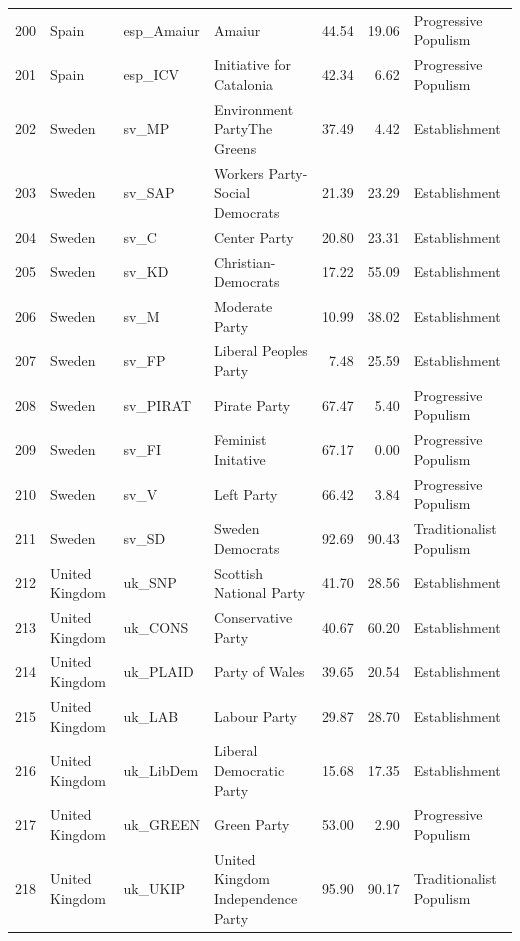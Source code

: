 \begin{landscape}
\begin{longtable}[c]{@{\extracolsep{\fill}}rlllrrl}
  200 & Spain & esp\_Amaiur & Amaiur & 44.54 & 19.06 & Progressive Populism \\ 
  201 & Spain & esp\_ICV & Initiative for Catalonia & 42.34 & 6.62 & Progressive Populism \\ 
  202 & Sweden & sv\_MP & Environment PartyThe Greens & 37.49 & 4.42 & Establishment \\ 
  203 & Sweden & sv\_SAP & Workers Party-Social Democrats & 21.39 & 23.29 & Establishment \\ 
  204 & Sweden & sv\_C & Center Party & 20.80 & 23.31 & Establishment \\ 
  205 & Sweden & sv\_KD & Christian-Democrats & 17.22 & 55.09 & Establishment \\ 
  206 & Sweden & sv\_M & Moderate Party & 10.99 & 38.02 & Establishment \\ 
  207 & Sweden & sv\_FP & Liberal Peoples Party & 7.48 & 25.59 & Establishment \\ 
  208 & Sweden & sv\_PIRAT & Pirate Party & 67.47 & 5.40 & Progressive Populism \\ 
  209 & Sweden & sv\_FI & Feminist Initative & 67.17 & 0.00 & Progressive Populism \\ 
  210 & Sweden & sv\_V & Left Party & 66.42 & 3.84 & Progressive Populism \\ 
  211 & Sweden & sv\_SD & Sweden Democrats & 92.69 & 90.43 & Traditionalist Populism \\ 
  212 & United Kingdom & uk\_SNP & Scottish National Party & 41.70 & 28.56 & Establishment \\ 
  213 & United Kingdom & uk\_CONS & Conservative Party & 40.67 & 60.20 & Establishment \\ 
  214 & United Kingdom & uk\_PLAID & Party of Wales & 39.65 & 20.54 & Establishment \\ 
  215 & United Kingdom & uk\_LAB & Labour Party & 29.87 & 28.70 & Establishment \\ 
  216 & United Kingdom & uk\_LibDem & Liberal Democratic Party & 15.68 & 17.35 & Establishment \\ 
  217 & United Kingdom & uk\_GREEN & Green Party & 53.00 & 2.90 & Progressive Populism \\ 
  218 & United Kingdom & uk\_UKIP & United Kingdom Independence Party & 95.90 & 90.17 & Traditionalist Populism \\ \hline
\end{longtable}
\end{landscape}





